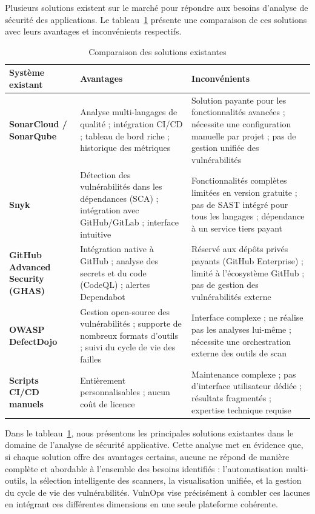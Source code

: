 \documentclass[12pt, a4paper, oneside]{report}
\begin{document}
Plusieurs solutions existent sur le marché pour répondre aux besoins d'analyse
de sécurité des applications. Le tableau~\ref{tab:existant} présente une comparaison
de ces solutions avec leurs avantages et inconvénients respectifs.

\begin{table}[H]
    \centering
    \caption{Comparaison des solutions existantes}
    \label{tab:existant}
    \begin{tabularx}{\textwidth}{|>{\bfseries}p{3cm}|X|X|}
        \hline
        \textbf{Système existant} & \textbf{Avantages} & \textbf{Inconvénients} \\
        \hline
        SonarCloud / SonarQube & 
        Analyse multi-langages de qualité ; intégration CI/CD ; tableau de bord riche ; 
        historique des métriques &
        Solution payante pour les fonctionnalités avancées ; nécessite une configuration 
        manuelle par projet ; pas de gestion unifiée des vulnérabilités \\
        \hline
        Snyk & 
        Détection des vulnérabilités dans les dépendances (SCA) ; intégration avec GitHub/GitLab ;
        interface intuitive &
        Fonctionnalités complètes limitées en version gratuite ; pas de SAST intégré
        pour tous les langages ; dépendance à un service tiers payant \\
        \hline
        GitHub Advanced Security (GHAS) &
        Intégration native à GitHub ; analyse des secrets et du code (CodeQL) ;
        alertes Dependabot &
        Réservé aux dépôts privés payants (GitHub Enterprise) ; limité à l'écosystème 
        GitHub ; pas de gestion des vulnérabilités externe \\
        \hline
        OWASP DefectDojo &
        Gestion open-source des vulnérabilités ; supporte de nombreux formats d'outils ;
        suivi du cycle de vie des failles &
        Interface complexe ; ne réalise pas les analyses lui-même ; nécessite une 
        orchestration externe des outils de scan \\
        \hline
        Scripts CI/CD manuels &
        Entièrement personnalisables ; aucun coût de licence &
        Maintenance complexe ; pas d'interface utilisateur dédiée ;
        résultats fragmentés ; expertise technique requise \\
        \hline
    \end{tabularx}
\end{table}

Dans le tableau~\ref{tab:existant}, nous présentons les principales solutions
existantes dans le domaine de l'analyse de sécurité applicative. Cette analyse
met en évidence que, si chaque solution offre des avantages certains, aucune
ne répond de manière complète et abordable à l'ensemble des besoins identifiés :
l'automatisation multi-outils, la sélection intelligente des scanners, la visualisation
unifiée, et la gestion du cycle de vie des vulnérabilités. VulnOps vise précisément
à combler ces lacunes en intégrant ces différentes dimensions en une seule plateforme
cohérente.
\end{document}
